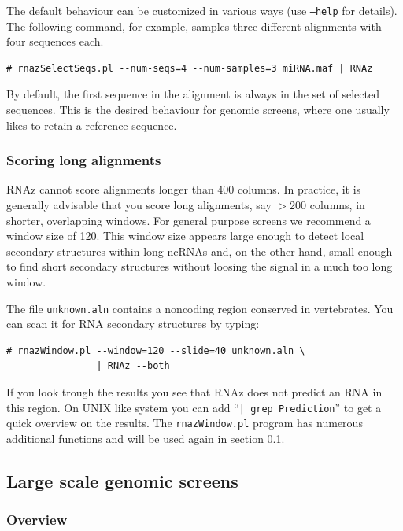 \documentclass[11pt]{article}
\begin{document}
The default behaviour can be customized in various ways (use
\texttt{--help} for details). The following command, for example, samples
three different alignments with four sequences each.

\begin{verbatim}
# rnazSelectSeqs.pl --num-seqs=4 --num-samples=3 miRNA.maf | RNAz
\end{verbatim}

By default, the first sequence in the alignment is always in the set of
selected sequences. This is the desired behaviour for genomic screens,
where one usually likes to retain a reference sequence.


\subsubsection{Scoring long alignments}
\label{sec:scor-long-alignm}

RNAz cannot score alignments longer than 400 columns. In practice, it is
generally advisable that you score long alignments, say $>$200 columns, in
shorter, overlapping windows. For general purpose screens we recommend a
window size of 120. This window size appears large enough to detect local
secondary structures within long ncRNAs and, on the other hand, small
enough to find short secondary structures without loosing the signal in a
much too long window.

The file \texttt{unknown.aln} contains a noncoding region conserved in
vertebrates. You can scan it for RNA secondary structures by typing:

\begin{verbatim}
# rnazWindow.pl --window=120 --slide=40 unknown.aln \
                | RNAz --both 
\end{verbatim}

If you look trough the results you see that RNAz does not predict an RNA in
this region. On UNIX like system you can add ``\texttt{| grep Prediction}''
to get a quick overview on the results. The \texttt{rnazWindow.pl} program
has numerous additional functions and will be used again in section
\ref{sec:large-scale-genomic}.

\subsection{Large scale genomic screens}
\label{sec:large-scale-genomic}

\subsubsection{Overview}
\end{document}
